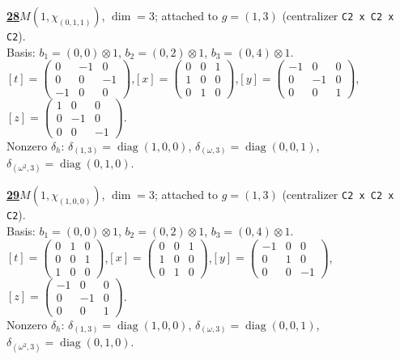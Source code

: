 \begin{samepage}\noindent\textbf{\underline{28}}\quad $M(1,\chi_{(0,1,1)})$, $\dim=3$; attached to $g=(1,3)$ (centralizer \texttt{C2 x C2 x C2}).\\
Basis: $b_{1}=(0,0)\otimes 1$, $b_{2}=(0,2)\otimes 1$, $b_{3}=(0,4)\otimes 1$.\\
$[t]=\left(\begin{smallmatrix} 0 & -1 & 0 \\ 0 & 0 & -1 \\ -1 & 0 & 0 \end{smallmatrix}\right)$,\quad $[x]=\left(\begin{smallmatrix} 0 & 0 & 1 \\ 1 & 0 & 0 \\ 0 & 1 & 0 \end{smallmatrix}\right)$,\quad $[y]=\left(\begin{smallmatrix} -1 & 0 & 0 \\ 0 & -1 & 0 \\ 0 & 0 & 1 \end{smallmatrix}\right)$,\quad $[z]=\left(\begin{smallmatrix} 1 & 0 & 0 \\ 0 & -1 & 0 \\ 0 & 0 & -1 \end{smallmatrix}\right)$.\\
Nonzero $\delta_h$: $\delta_{(1,3)}=\operatorname{diag}(1,0,0)$, $\delta_{(\omega,3)}=\operatorname{diag}(0,0,1)$, $\delta_{(\omega^2,3)}=\operatorname{diag}(0,1,0)$.\end{samepage}
\medskip

\begin{samepage}\noindent\textbf{\underline{29}}\quad $M(1,\chi_{(1,0,0)})$, $\dim=3$; attached to $g=(1,3)$ (centralizer \texttt{C2 x C2 x C2}).\\
Basis: $b_{1}=(0,0)\otimes 1$, $b_{2}=(0,2)\otimes 1$, $b_{3}=(0,4)\otimes 1$.\\
$[t]=\left(\begin{smallmatrix} 0 & 1 & 0 \\ 0 & 0 & 1 \\ 1 & 0 & 0 \end{smallmatrix}\right)$,\quad $[x]=\left(\begin{smallmatrix} 0 & 0 & 1 \\ 1 & 0 & 0 \\ 0 & 1 & 0 \end{smallmatrix}\right)$,\quad $[y]=\left(\begin{smallmatrix} -1 & 0 & 0 \\ 0 & 1 & 0 \\ 0 & 0 & -1 \end{smallmatrix}\right)$,\quad $[z]=\left(\begin{smallmatrix} -1 & 0 & 0 \\ 0 & -1 & 0 \\ 0 & 0 & 1 \end{smallmatrix}\right)$.\\
Nonzero $\delta_h$: $\delta_{(1,3)}=\operatorname{diag}(1,0,0)$, $\delta_{(\omega,3)}=\operatorname{diag}(0,0,1)$, $\delta_{(\omega^2,3)}=\operatorname{diag}(0,1,0)$.\end{samepage}
\medskip


